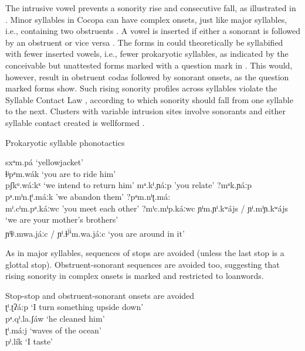 \documentclass[output=paper,colorlinks,citecolor=brown]{langscibook}
\begin{document}
The intrusive vowel prevents a sonority rise and consecutive fall, as illustrated in . Minor syllables in Cocopa can have complex onsets, just like major syllables, i.e., containing two obstruents . A vowel is inserted if either a sonorant is followed by an obstruent or vice versa . The forms in  could theoretically be syllabified with fewer inserted vowels, i.e., fewer prokaryotic syllables, as indicated by the conceivable but unattested forms marked with a question mark in . This would, however, result in obstruent codas followed by sonorant onsets, as the question marked forms show. Such rising sonority profiles across syllables violate the Syllable Contact Law \citep{MurrayVenneman1983}, according to which sonority should fall from one syllable to the next. Clusters with variable intrusion sites involve sonorants and either syllable contact created is wellformed .

\TabPositions{4cm,6cm,8cm,10cm}
\begin{exe}
    \ex \label{ex12} Prokaryotic syllable phonotactics
    \begin{xlist}
        \ex \label{ex12a} sxᵃm.pá   \tab ‘yellowjacket’\\
        ɬʲpᵃm.wák   \tab ‘you are to ride him’\\
        pʃkᵘ.wáːkˣ \tab ‘we intend to return him’
        \ex \label{ex12b} mᵃ.kⁱ.ɲáːp \tab    {}'you relate'  \tab   \tab        ?mᵃk.ɲáːp \\ pᵃ.mⁱn.ʈⁱ.máːk \tab 'we abandon them' \tab    ?pᵃm.nⁱʈ.má:\\ mⁱ.cⁱm.pᵃ.káːwc \tab 'you meet each other' \tab  ?mⁱc.mⁱp.káːwc
        \TabPositions{5cm}
        \ex \label{ex12c} ɲⁱm.ɲⁱ.kʷájs / ɲⁱ.mⁱɲ.kʷájs   \tab  ‘we are your mother's brothers’\\
        ɲⁱɬʲ.mwa.jáːc / ɲⁱ.ɬ\textsuperscript{ji}m.wa.jáːc  \tab  ‘you are around in it’
    \end{xlist}
\end{exe}

As in major syllables, sequences of stops are avoided (unless the last stop is a glottal stop). Obstruent-sonorant sequences are avoided too, suggesting that rising sonority in complex onsets is marked and restricted to loanwords. 


\TabPositions{2cm, 4cm,6cm,8cm,10cm}
\begin{exe}
    \ex \label{ex13}Stop-stop and obstruent-sonorant onsets are avoided\\
    ʈⁱ.ʈʔá:p  \tab   ‘I turn something upside down’\\
    pᵃ.qⁱ.la.ʃáw  \tab ‘he cleaned him’\\
    ʈⁱ.má:j  \tab   ‘waves of the ocean’\\
    pⁱ.lík  \tab    ‘I taste’
\end{exe}
\end{document}
